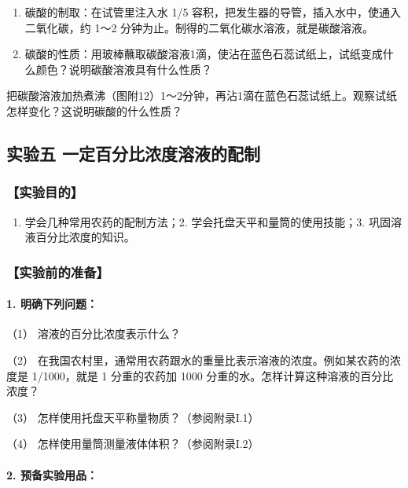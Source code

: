 \begin{enumerate}[start=4]
\item
  碳酸的制取：在试管里注入水 1/5
  容积，把发生器的导管，插入水中，使通入二氧化碳，约 1～2
  分钟为止。制得的二氧化碳水溶液，就是碳酸溶液。
\item
  碳酸的性质：用玻棒蘸取碳酸溶液1滴，使沾在蓝色石蕊试纸上，试纸变成什么颜色？说明碳酸溶液具有什么性质？
\end{enumerate}

把碳酸溶液加热煮沸（图附12）1～2分钟，再沾1滴在蓝色石蕊试纸上。观察试纸怎样变化？这说明碳酸的什么性质？

\subsection{实验五 一定百分比浓度溶液的配制}

\subsubsection{【实验目的】}

\begin{enumerate}
\item
  学会几种常用农药的配制方法；2. 学会托盘天平和量筒的使用技能；3.
  巩固溶液百分比浓度的知识。
\end{enumerate}

\subsubsection{【实验前的准备】}

\paragraph{1. 明确下列问题：}

（1） 溶液的百分比浓度表示什么？

（2）
在我国农村里，通常用农药跟水的重量比表示溶液的浓度。例如某农药的浓度是
1/1000，就是 1 分重的农药加 1000
分重的水。怎样计算这种溶液的百分比浓度？

（3） 怎样使用托盘天平称量物质？（参阅附录I.1）

（4） 怎样使用量筒测量液体体积？（参阅附录I.2）

\paragraph{2. 预备实验用品：}

